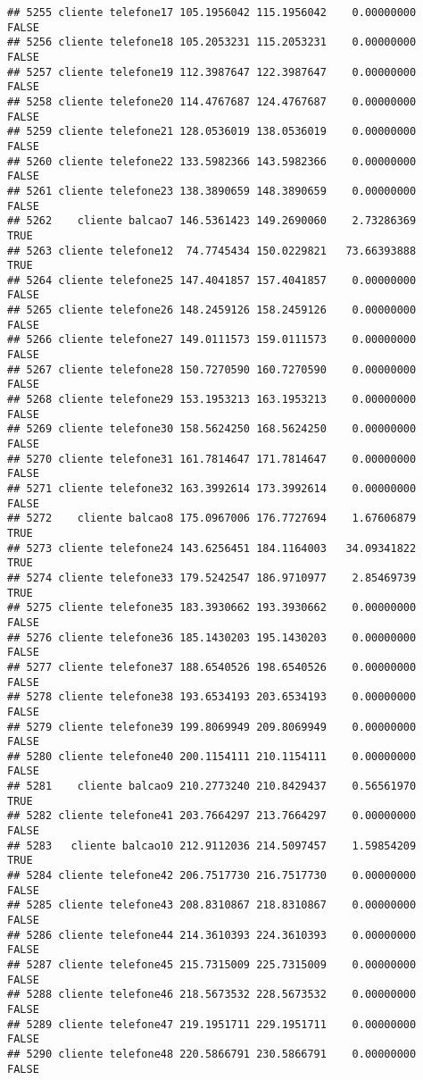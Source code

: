 \documentclass[
]{article}
\begin{document}
\begin{verbatim}
## 5255 cliente telefone17 105.1956042 115.1956042    0.00000000    FALSE
## 5256 cliente telefone18 105.2053231 115.2053231    0.00000000    FALSE
## 5257 cliente telefone19 112.3987647 122.3987647    0.00000000    FALSE
## 5258 cliente telefone20 114.4767687 124.4767687    0.00000000    FALSE
## 5259 cliente telefone21 128.0536019 138.0536019    0.00000000    FALSE
## 5260 cliente telefone22 133.5982366 143.5982366    0.00000000    FALSE
## 5261 cliente telefone23 138.3890659 148.3890659    0.00000000    FALSE
## 5262    cliente balcao7 146.5361423 149.2690060    2.73286369     TRUE
## 5263 cliente telefone12  74.7745434 150.0229821   73.66393888     TRUE
## 5264 cliente telefone25 147.4041857 157.4041857    0.00000000    FALSE
## 5265 cliente telefone26 148.2459126 158.2459126    0.00000000    FALSE
## 5266 cliente telefone27 149.0111573 159.0111573    0.00000000    FALSE
## 5267 cliente telefone28 150.7270590 160.7270590    0.00000000    FALSE
## 5268 cliente telefone29 153.1953213 163.1953213    0.00000000    FALSE
## 5269 cliente telefone30 158.5624250 168.5624250    0.00000000    FALSE
## 5270 cliente telefone31 161.7814647 171.7814647    0.00000000    FALSE
## 5271 cliente telefone32 163.3992614 173.3992614    0.00000000    FALSE
## 5272    cliente balcao8 175.0967006 176.7727694    1.67606879     TRUE
## 5273 cliente telefone24 143.6256451 184.1164003   34.09341822     TRUE
## 5274 cliente telefone33 179.5242547 186.9710977    2.85469739     TRUE
## 5275 cliente telefone35 183.3930662 193.3930662    0.00000000    FALSE
## 5276 cliente telefone36 185.1430203 195.1430203    0.00000000    FALSE
## 5277 cliente telefone37 188.6540526 198.6540526    0.00000000    FALSE
## 5278 cliente telefone38 193.6534193 203.6534193    0.00000000    FALSE
## 5279 cliente telefone39 199.8069949 209.8069949    0.00000000    FALSE
## 5280 cliente telefone40 200.1154111 210.1154111    0.00000000    FALSE
## 5281    cliente balcao9 210.2773240 210.8429437    0.56561970     TRUE
## 5282 cliente telefone41 203.7664297 213.7664297    0.00000000    FALSE
## 5283   cliente balcao10 212.9112036 214.5097457    1.59854209     TRUE
## 5284 cliente telefone42 206.7517730 216.7517730    0.00000000    FALSE
## 5285 cliente telefone43 208.8310867 218.8310867    0.00000000    FALSE
## 5286 cliente telefone44 214.3610393 224.3610393    0.00000000    FALSE
## 5287 cliente telefone45 215.7315009 225.7315009    0.00000000    FALSE
## 5288 cliente telefone46 218.5673532 228.5673532    0.00000000    FALSE
## 5289 cliente telefone47 219.1951711 229.1951711    0.00000000    FALSE
## 5290 cliente telefone48 220.5866791 230.5866791    0.00000000    FALSE

\end{verbatim}
\end{document}
